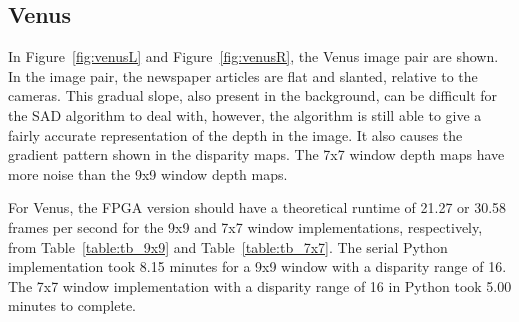 \subsection{Venus}
\label{sec:venus}

In Figure~\ref{fig:venusL} and Figure~\ref{fig:venusR}, the Venus image pair are shown. In the image pair, the newspaper articles are flat and slanted, relative to the cameras. This gradual slope, also present in the background, can be difficult for the SAD algorithm to deal with, however, the algorithm is still able to give a fairly accurate representation of the depth in the image. It also causes the gradient pattern shown in the disparity maps. The 7x7 window depth maps have more noise than the 9x9 window depth maps.

For Venus, the FPGA version should have a theoretical runtime of 21.27 or 30.58 frames per second for the 9x9 and 7x7 window implementations, respectively, from Table~\ref{table:tb_9x9} and Table~\ref{table:tb_7x7}. The serial Python implementation took 8.15 minutes for a 9x9 window with a disparity range of 16. The 7x7 window implementation with a disparity range of 16 in Python took 5.00 minutes to complete.

